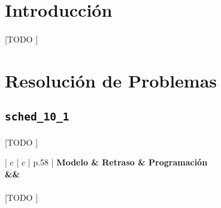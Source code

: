 \documentclass[spanish]{article}
\begin{document}
	\maketitle %

	\thispagestyle{fancy} %



	\begin{abstract}
		\noindent [TODO ]
	\end{abstract}


	\section{Introducción}
	\label{sec:intro}

		\paragraph{}
		[TODO ]

	\section{Resolución de Problemas}
	\label{sec:problems}

		\subsection{\texttt{sched\_10\_1}}

			\paragraph{}
			[TODO ]

			\begin{table}[h]
				\centering
				\begin{tabu}{ | c | c | p{.58\linewidth} |}
					\hline
					\bfseries Modelo & \bfseries Retraso & \bfseries Programación
					{\\\hline\model&\delay&\schedule}
					\\\hline
				\end{tabu}
				\caption{[TODO ]}
				\label{table:sol-sched_10_1}
			\end{table}

			\paragraph{}
			[TODO ]
\end{document}
